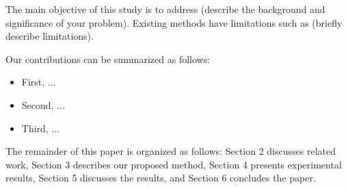 The main objective of this study is to address (describe the background and significance of your problem). Existing methods have limitations such as (briefly describe limitations).

Our contributions can be summarized as follows:

\begin{itemize}
    \item First, ...
    \item Second, ...
    \item Third, ...
\end{itemize}

The remainder of this paper is organized as follows: Section 2 discusses related work, Section 3 describes our proposed method, Section 4 presents experimental results, Section 5 discusses the results, and Section 6 concludes the paper.
